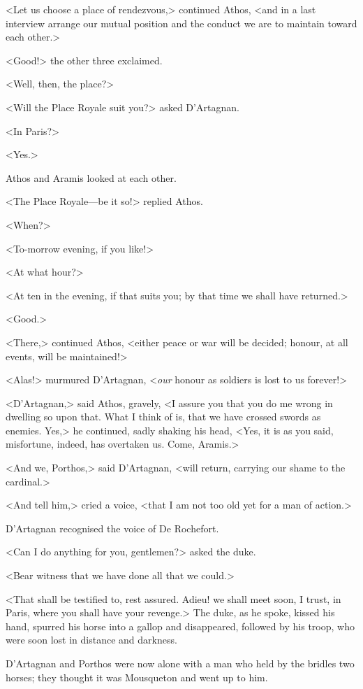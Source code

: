 <Let us choose a place of rendezvous,> continued Athos, <and in a last interview arrange our mutual position and the conduct we are to maintain toward each other.>

<Good!> the other three exclaimed.

<Well, then, the place?>

<Will the Place Royale suit you?> asked D'Artagnan.

<In Paris?>

<Yes.>

Athos and Aramis looked at each other.

<The Place Royale—be it so!> replied Athos.

<When?>

<To-morrow evening, if you like!>

<At what hour?>

<At ten in the evening, if that suits you; by that time we shall have returned.>

<Good.>

<There,> continued Athos, <either peace or war will be decided; honour, at all events, will be maintained!>

<Alas!> murmured D'Artagnan, <\textit{our} honour as soldiers is lost to us forever!>

<D'Artagnan,> said Athos, gravely, <I assure you that you do me wrong in dwelling so upon that. What I think of is, that we have crossed swords as enemies. Yes,> he continued, sadly shaking his head, <Yes, it is as you said, misfortune, indeed, has overtaken us. Come, Aramis.>

<And we, Porthos,> said D'Artagnan, <will return, carrying our shame to the cardinal.>

<And tell him,> cried a voice, <that I am not too old yet for a man of action.>

D'Artagnan recognised the voice of De Rochefort.

<Can I do anything for you, gentlemen?> asked the duke.

<Bear witness that we have done all that we could.>

<That shall be testified to, rest assured. Adieu! we shall meet soon, I trust, in Paris, where you shall have your revenge.> The duke, as he spoke, kissed his hand, spurred his horse into a gallop and disappeared, followed by his troop, who were soon lost in distance and darkness.

D'Artagnan and Porthos were now alone with a man who held by the bridles two horses; they thought it was Mousqueton and went up to him.

